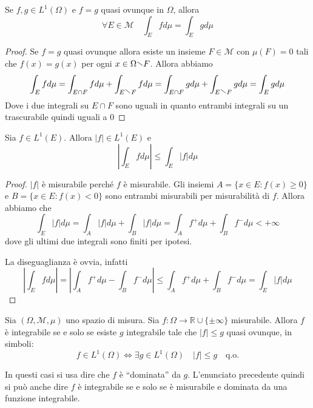 \begin{corollary}
    Se \(f, g \in L^{1} (\Omega)\) e \(f = g\) quasi ovunque in \(\Omega\),
    allora \[\forall E \in \mathcal{M} \quad \int_{E} f d\mu = \int_{E} g d\mu\]
\end{corollary}
\begin{proof}
    Se \(f=g\) quasi ovunque allora esiste un insieme \(F \in \mathcal{M}\) con
    \(\mu(F) = 0\) tali che \(f(x) = g(x)\) per ogni \(x \in \Omega \sminus F\).
    Allora abbiamo
    \[
        \int_{E} f d\mu = \int_{E \cap F} f d\mu + \int_{E \sminus F} f d\mu =
        \int_{E \cap F} g d\mu + \int_{E \sminus F} g d\mu = \int_{E} g d\mu
    \]
    Dove i due integrali su \(E \cap F\) sono uguali in quanto entrambi
    integrali su un trascurabile quindi uguali a 0
\end{proof}
\begin{proposition}\label{help:cau_sch_int}
    Sia \(f \in L^{1}(E)\). Allora \(|f| \in L^{1}(E)\) e
    \[
        \left| \int_{E} f d\mu \right| \le \int_{E} |f| d\mu
    \]
\end{proposition}
\begin{proof}
    \(|f|\) è misurabile perché \(f\) è misurabile. Gli insiemi \(A = \{x \in E:
    f(x) \ge 0\} \) e \(B = \{x \in E : f(x) < 0\} \) sono entrambi misurabili
    per misurabilità di \(f\). Allora abbiamo che
    \[
        \int_E |f| d\mu = \int_{A} |f| d\mu + \int_{B} |f| d\mu = \int_{A} f^{+}
        d\mu + \int_B f^{-} d\mu < +\infty
    \]
    dove gli ultimi due integrali sono finiti per ipotesi.

    La diseguaglianza è ovvia, infatti
    \[
        \left|\int_{E} f d\mu\right| =\left| \int_{A} f^{+} d\mu - \int_{B}
        f^{-} d\mu \right| \le \int_{A}
        f^{+}
        d\mu + \int_{B} f^{-} d\mu = \int_{E} |f| d\mu
    \]
\end{proof}
\begin{theorem}\label{th:cnes_L1}
    Sia \((\Omega, \mathcal{M}, \mu)\) uno spazio di misura. Sia \(f : \Omega
    \to  \mathbb{R}\cup \{\pm\infty\} \) misurabile. Allora \(f\) è integrabile
    se e solo se esiste \(g\) integrabile tale che \(|f| \le g\) quasi ovunque,
    in simboli: 
    \[
        f \in L^{1}(\Omega) \iff \exists g \in L^{1}(\Omega) \quad |f| \le g
        \quad \text{q.o.}
    \]
\end{theorem}
\begin{note}
    In questi casi si usa dire che \(f\) è  ``dominata'' da \(g\). L'enunciato
    precedente quindi si può anche dire \(f\) è integrabile se e solo se è
    misurabile e dominata da una funzione integrabile.
\end{note}
